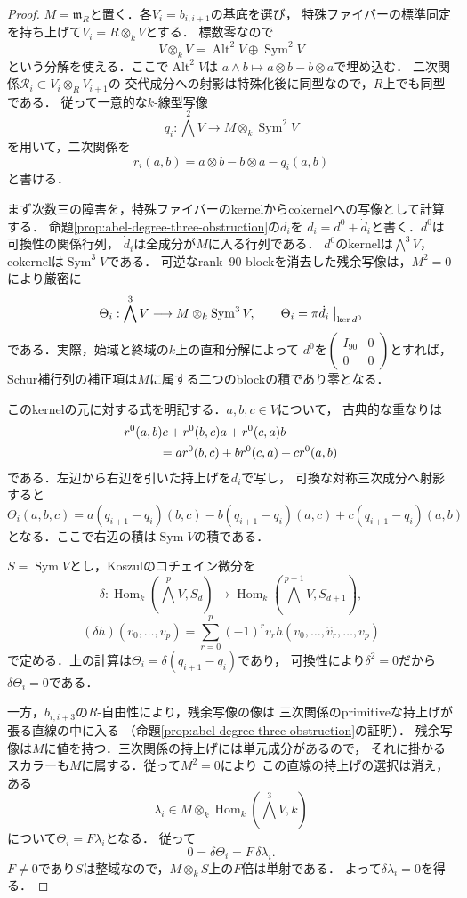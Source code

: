 \begin{proof}
$M=\mathfrak m_R$と置く．各$V_i=b_{i,i+1}$の基底を選び，
特殊ファイバーの標準同定を持ち上げて$V_i=R\otimes_kV$とする．
標数零なので
\[
 V\otimes_kV=\operatorname{Alt}^2V\oplus\operatorname{Sym}^2V
\]
という分解を使える．ここで$\operatorname{Alt}^2V$は
$a\wedge b\mapsto a\otimes b-b\otimes a$で埋め込む．
二次関係$\mathcal R_i\subset V_i\otimes_RV_{i+1}$の
交代成分への射影は特殊化後に同型なので，$R$上でも同型である．
従って一意的な$k$-線型写像
\[
 q_i:\bigwedge^2V\longrightarrow M\otimes_k\operatorname{Sym}^2V
\]
を用いて，二次関係を
\[
 r_i(a,b)=a\otimes b-b\otimes a-q_i(a,b)
\]
と書ける．

まず次数三の障害を，特殊ファイバーのkernelからcokernelへの写像として計算する．
命題\ref{prop:abel-degree-three-obstruction}の$d_i$を
$d_i=d^0+\dot d_i$と書く．$d^0$は可換性の関係行列，
$\dot d_i$は全成分が$M$に入る行列である．
$d^0$のkernelは$\bigwedge^3V$，cokernelは$\operatorname{Sym}^3V$である．
可逆なrank~90 blockを消去した残余写像は，$M^2=0$により厳密に
\[
 \Theta_i:\bigwedge^3V\longrightarrow
 M\otimes_k\operatorname{Sym}^3V,
 \qquad \Theta_i=\pi\dot d_i\bigm|_{\ker d^0}
\]
である．実際，始域と終域の$k$上の直和分解によって
$d^0$を$\left(\begin{smallmatrix}I_{90}&0\\0&0\end{smallmatrix}\right)$とすれば，
Schur補行列の補正項は$M$に属する二つのblockの積であり零となる．

このkernelの元に対する式を明記する．$a,b,c\in V$について，
古典的な重なりは
\[
\begin{aligned}
 &r^0(a,b)c+r^0(b,c)a+r^0(c,a)b\\
 &\hspace{10mm}=a r^0(b,c)+b r^0(c,a)+c r^0(a,b)
\end{aligned}
\]
である．左辺から右辺を引いた持上げを$d_i$で写し，
可換な対称三次成分へ射影すると
\[
 \Theta_i(a,b,c)
 =a(q_{i+1}-q_i)(b,c)
  -b(q_{i+1}-q_i)(a,c)
  +c(q_{i+1}-q_i)(a,b)
\]
となる．ここで右辺の積は$\operatorname{Sym}V$の積である．

$S=\operatorname{Sym}V$とし，Koszulのコチェイン微分を
\[
 \delta:\operatorname{Hom}_k(\bigwedge^pV,S_d)
 \longrightarrow\operatorname{Hom}_k(\bigwedge^{p+1}V,S_{d+1}),
\]
\[
 (\delta h)(v_0,\ldots,v_p)
   =\sum_{r=0}^p(-1)^r v_r
      h(v_0,\ldots,\widehat v_r,\ldots,v_p)
\]
で定める．上の計算は$\Theta_i=\delta(q_{i+1}-q_i)$であり，
可換性により$\delta^2=0$だから$\delta\Theta_i=0$である．

一方，$b_{i,i+3}$の$R$-自由性により，残余写像の像は
三次関係のprimitiveな持上げが張る直線の中に入る
（命題\ref{prop:abel-degree-three-obstruction}の証明）．
残余写像は$M$に値を持つ．三次関係の持上げには単元成分があるので，
それに掛かるスカラーも$M$に属する．従って$M^2=0$により
この直線の持上げの選択は消え，
ある
\[
 \lambda_i\in M\otimes_k\operatorname{Hom}_k(\bigwedge^3V,k)
\]
について$\Theta_i=F\lambda_i$となる．
従って
\[
 0=\delta\Theta_i=F\,\delta\lambda_i.
\]
$F\ne0$であり$S$は整域なので，$M\otimes_kS$上の$F$倍は単射である．
よって$\delta\lambda_i=0$を得る．


\end{proof}
